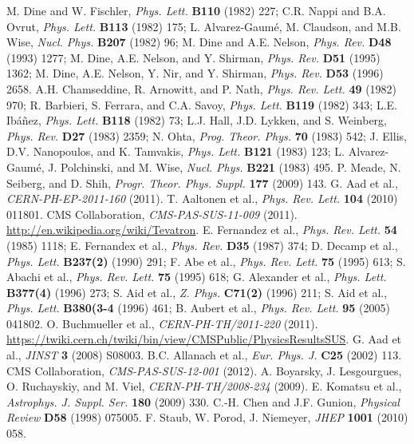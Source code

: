 \documentclass[12pt, letterpaper]{report}
\begin{document}
\begin{thebibliography}{99}

 M. Dine and W. Fischler, \textit{Phys. Lett.} \textbf{B110} (1982) 227; C.R. Nappi and B.A. Ovrut, \textit{Phys. Lett.} \textbf{B113} (1982) 175; L. Alvarez-Gaum\'e, M. Claudson, and M.B. Wise, \textit{Nucl. Phys.} \textbf{B207} (1982) 96; M. Dine and A.E. Nelson, \textit{Phys. Rev.} \textbf{D48} (1993) 1277; M. Dine, A.E. Nelson, and Y. Shirman, \textit{Phys. Rev.} \textbf{D51} (1995) 1362; M. Dine, A.E. Nelson, Y. Nir, and Y. Shirman, \textit{Phys. Rev.} \textbf{D53} (1996) 2658.
 A.H. Chamseddine, R. Arnowitt, and P. Nath, \textit{Phys. Rev. Lett.} \textbf{49} (1982) 970; R. Barbieri, S. Ferrara, and C.A. Savoy, \textit{Phys. Lett.} \textbf{B119} (1982) 343; L.E. Ib\'a\~{n}ez, \textit{Phys. Lett.} \textbf{B118} (1982) 73; L.J. Hall, J.D. Lykken, and S. Weinberg, \textit{Phys. Rev.} \textbf{D27} (1983) 2359; N. Ohta, \textit{Prog. Theor. Phys.} \textbf{70} (1983) 542; J. Ellis, D.V. Nanopoulos, and K. Tamvakis, \textit{Phys. Lett.} \textbf{B121} (1983) 123; L. Alvarez-Gaum\'e, J. Polchinski, and M. Wise, \textit{Nucl. Phys.} \textbf{B221} (1983) 495.
 P. Meade, N. Seiberg, and D. Shih, \textit{Progr. Theor. Phys. Suppl.} \textbf{177} (2009) 143.
 G. Aad et al., \textit{CERN-PH-EP-2011-160} (2011).
 T. Aaltonen et al., \textit{Phys. Rev. Lett.} \textbf{104} (2010) 011801.
 CMS Collaboration, \textit{CMS-PAS-SUS-11-009} (2011).
 \url{http://en.wikipedia.org/wiki/Tevatron}.
 E. Fernandez et al., \textit{Phys. Rev. Lett.} \textbf{54} (1985) 1118; E. Fernandex et al., \textit{Phys. Rev.} \textbf{D35} (1987) 374; D. Decamp et al., \textit{Phys. Lett.} \textbf{B237(2)} (1990) 291; F. Abe et al., \textit{Phys. Rev. Lett.} \textbf{75} (1995) 613; S. Abachi et al., \textit{Phys. Rev. Lett.} \textbf{75} (1995) 618; G. Alexander et al., \textit{Phys. Lett.} \textbf{B377(4)} (1996) 273; S. Aid et al., \textit{Z. Phys.} \textbf{C71(2)} (1996) 211; S. Aid et al., \textit{Phys. Lett.} \textbf{B380(3-4} (1996) 461; B. Aubert et al., \textit{Phys. Rev. Lett.} \textbf{95} (2005) 041802.
 O. Buchmueller et al., \textit{CERN-PH-TH/2011-220} (2011).
 \url{https://twiki.cern.ch/twiki/bin/view/CMSPublic/PhysicsResultsSUS}.
 G. Aad et al., \textit{JINST} \textbf{3} (2008) S08003.
 B.C. Allanach et al., \textit{Eur. Phys. J.} \textbf{C25} (2002) 113.
 CMS Collaboration, \textit{CMS-PAS-SUS-12-001} (2012).
 A. Boyarsky, J. Lesgourgues, O. Ruchayskiy, and M. Viel, \textit{CERN-PH-TH/2008-234} (2009).
 E. Komatsu et al., \textit{Astrophys. J. Suppl. Ser.} \textbf{180} (2009) 330.
 C.-H. Chen and J.F. Gunion, \textit{Physical Review} \textbf{D58} (1998) 075005.
 F. Staub, W. Porod, J. Niemeyer, \textit{JHEP} \textbf{1001} (2010) 058.


\end{thebibliography}
\end{document}
